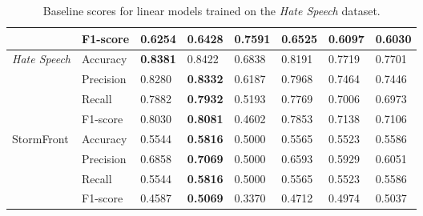 \begin{table}[]
\begin{minipage}{0.42\paperheight}
{\begin{tabular}{ll|ll|ll|ll}
                                           & F1-score  & 0.6254       & 0.6428           & \bf{0.7591} & 0.6525        & 0.6097      & 0.6030      \\ \hline
    \multirow{4}{*}{\textit{Hate Speech}}  & Accuracy  & \bf{0.8381}  & 0.8422           & 0.6838      & 0.8191        & 0.7719      & 0.7701      \\
                                           & Precision & 0.8280       & \bf{0.8332}      & 0.6187      & 0.7968        & 0.7464      & 0.7446      \\
                                           & Recall    & 0.7882       & \bf{0.7932}      & 0.5193      & 0.7769        & 0.7006      & 0.6973      \\
                                           & F1-score  & 0.8030       & \bf{0.8081}      & 0.4602      & 0.7853        & 0.7138      & 0.7106      \\ \hline
    \multirow{4}{*}{StormFront}            & Accuracy  & 0.5544       & \bf{0.5816}      & 0.5000      & 0.5565        & 0.5523      & 0.5586      \\
                                           & Precision & 0.6858       & \bf{0.7069}      & 0.5000      & 0.6593        & 0.5929      & 0.6051      \\
                                           & Recall    & 0.5544       & \bf{0.5816}      & 0.5000      & 0.5565        & 0.5523      & 0.5586      \\
                                           & F1-score  & 0.4587       & \bf{0.5069}      & 0.3370      & 0.4712        & 0.4974      & 0.5037
    \end{tabular}%
    }
    \caption{Baseline scores for linear models trained on the \textit{Hate Speech} dataset.}
    \label{tab:linear_hatespeech_baselines}
\end{minipage}
\end{table}

